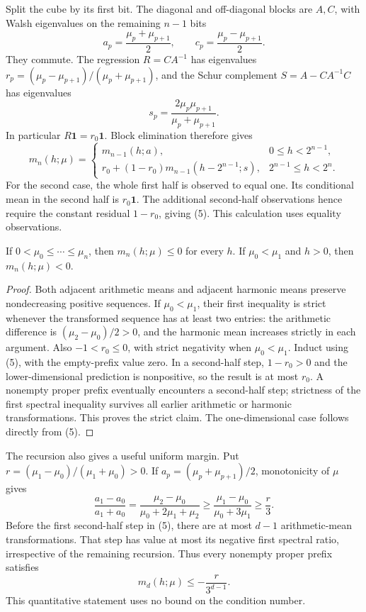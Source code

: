 \documentclass[11pt]{article}
\newcommand{\one}{\mathbf1}
\begin{document}
Split the cube by its first bit. The diagonal and off-diagonal blocks
are $A,C$, with Walsh eigenvalues on the remaining $n-1$ bits
\[
             a_p=\frac{\mu_p+\mu_{p+1}}2,\qquad
             c_p=\frac{\mu_p-\mu_{p+1}}2.
\]
They commute. The regression $R=CA^{-1}$ has eigenvalues
$r_p=(\mu_p-\mu_{p+1})/(\mu_p+\mu_{p+1})$, and the Schur complement
$S=A-CA^{-1}C$ has eigenvalues
\[
                  s_p=\frac{2\mu_p\mu_{p+1}}
                                      {\mu_p+\mu_{p+1}}.       \tag{4}
\]
In particular $R\one=r_0\one$. Block elimination therefore gives
\[
 m_n(h;\mu)=
 \begin{cases}
 m_{n-1}(h;a),&0\le h<2^{n-1},\\
 r_0+(1-r_0)m_{n-1}(h-2^{n-1};s),&2^{n-1}\le h<2^n.
 \end{cases}                                                  \tag{5}
\]
For the second case, the whole first half is observed to equal one.
Its conditional mean in the second half is $r_0\one$.
The additional second-half observations hence require the constant
residual $1-r_0$, giving (5). This calculation uses equality observations.

\begin{lemma}
If $0<\mu_0\le\cdots\le\mu_n$, then $m_n(h;\mu)\le0$
for every $h$. If $\mu_0<\mu_1$ and $h>0$, then $m_n(h;\mu)<0$.
\end{lemma}
\begin{proof}
Both adjacent arithmetic means and adjacent harmonic means preserve
nondecreasing positive sequences. If $\mu_0<\mu_1$, their first
inequality is strict whenever the transformed sequence has at least
two entries: the arithmetic difference is
$(\mu_2-\mu_0)/2>0$, and the harmonic mean increases strictly in
each argument. Also $-1<r_0\le0$, with strict negativity when
$\mu_0<\mu_1$.
Induct using (5), with the empty-prefix value zero.
In a second-half step, $1-r_0>0$ and the lower-dimensional prediction
is nonpositive, so the result is at most $r_0$.
A nonempty proper prefix eventually encounters a second-half step;
strictness of the first spectral inequality survives all earlier
arithmetic or harmonic transformations. This proves the strict claim.
The one-dimensional case follows directly from (5).
\end{proof}

The recursion also gives a useful uniform margin. Put
$r=(\mu_1-\mu_0)/(\mu_1+\mu_0)>0$. If $a_p=(\mu_p+\mu_{p+1})/2$,
monotonicity of $\mu$ gives
\[
 \frac{a_1-a_0}{a_1+a_0}
 =\frac{\mu_2-\mu_0}{\mu_0+2\mu_1+\mu_2}
 \ge\frac{\mu_1-\mu_0}{\mu_0+3\mu_1}\ge\frac r3.
\]
Before the first second-half step in (5), there are at most $d-1$
arithmetic-mean transformations. That step has value at most its
negative first spectral ratio, irrespective of the remaining recursion.
Thus every nonempty proper prefix satisfies
\[
                         m_d(h;\mu)\le-\frac r{3^{d-1}}.
                                                               \tag{Q1}
\]
This quantitative statement uses no bound on the condition number.
\end{document}
